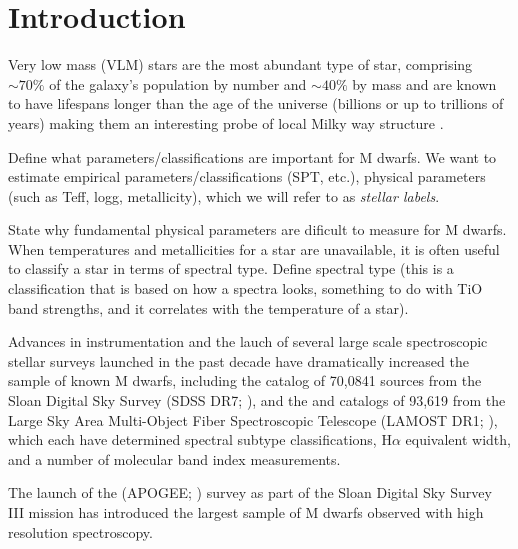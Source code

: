 \documentclass[modern]{aastex62}
\begin{document}
 
\section{Introduction} \label{sec:intro}

Very low mass (VLM) stars are the most abundant type of star, comprising $\sim 70 \%$ of the galaxy's population by number \citep{Bochanski:2010} and $\sim 40 \%$ by mass and are known to have lifespans longer than the age of the universe (billions or up to trillions of years) \citep{Laughlin:1997} making them an interesting probe of local Milky way structure \citep{Bochanski:2007}. 

Define what parameters/classifications are important for M dwarfs. We want to estimate empirical parameters/classifications (SPT, etc.), physical parameters (such as Teff, logg, metallicity), which we will refer to as \emph{stellar labels}. 

State why fundamental physical parameters are dificult to measure for M dwarfs. When temperatures and metallicities for a star are unavailable, it is often useful to classify a star in terms of spectral type. Define spectral type (this is a classification that is based on how a spectra looks, something to do with TiO band strengths, and it correlates with the temperature of a star). 

Advances in instrumentation and the lauch of several large scale spectroscopic stellar surveys launched in the past decade have dramatically increased the sample of known M dwarfs, including the \citealt{West:2011} catalog of 70,0841 sources from the Sloan Digital Sky Survey (SDSS DR7; \citealt{Abazajian:2009}), and the \citealt{Yi:2014} and \citealt{Guo:2015} catalogs of 93,619 from the Large Sky Area Multi-Object Fiber Spectroscopic Telescope (LAMOST DR1; \citealt{Zhao:2012}), which each have determined spectral subtype classifications, H$\alpha$ equivalent width, and a number of molecular band index measurements. 

The launch of the (APOGEE; \citealt{Majewski:2015}) survey as part of the Sloan Digital Sky Survey III mission \citealt{Eisenstein:2011} has introduced the largest sample of M dwarfs observed with high resolution spectroscopy. \color{gcolor}{What about APOGEE's wavelength coverage, resolution, selection and other specs allow us to do things with M dwarfs that other surveys/instruments can't?}\color{black}
\end{document}
